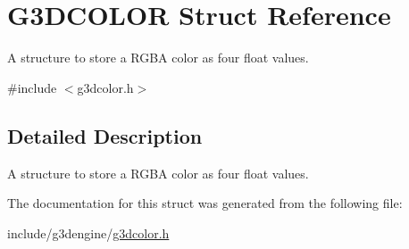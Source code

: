 \hypertarget{structG3DCOLOR}{}\section{G3\+D\+C\+O\+L\+OR Struct Reference}
\label{structG3DCOLOR}


A structure to store a R\+G\+BA color as four float values.  




{\ttfamily \#include $<$g3dcolor.\+h$>$}



\subsection{Detailed Description}
A structure to store a R\+G\+BA color as four float values. 

The documentation for this struct was generated from the following file\+:\begin{DoxyCompactItemize}
\item 
include/g3dengine/\hyperlink{g3dcolor_8h}{g3dcolor.\+h}\end{DoxyCompactItemize}
